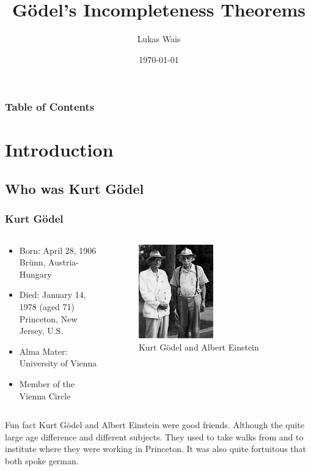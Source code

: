 \documentclass[aspectratio=169]{beamer}
\title{Gödel's Incompleteness Theorems}
\author{Lukas Wais}
\institute{Special Topics Course 326.901}
\date{\today}
\begin{document}
\frame{\titlepage}
\begin{frame}[allowframebreaks]
	\frametitle{Table of Contents}
	\tableofcontents
\end{frame}
\section{Introduction}
\subsection{Who was Kurt Gödel}
\begin{frame}[allowframebreaks]
	\frametitle{Kurt Gödel}
	\begin{columns}
		\begin{column}{0.5\textwidth}
   			\begin{itemize}
   				\item Born: April 28, 1906 Brünn, Austria-Hungary
   				\item Died: January 14, 1978 (aged 71) Princeton, New Jersey, U.S.
   				\item Alma Mater: University of Vienna
   				\item Member of the Vienna Circle
   			\end{itemize}
   		\end{column}
		\begin{column}{0.4\textwidth}
			\begin{figure}[h]
				\centering
				\includegraphics[width=0.5\textwidth]{img/godel_albert}
				\caption{Kurt Gödel and Albert Einstein}
			\end{figure}
		\end{column}	
	\end{columns}
	\begin{block}{Fun fact}
		Kurt Gödel and Albert Einstein were good friends. Although the quite large age difference and different subjects. They used to take walks from and to institute where they were working in Princeton. It was also quite fortuitous that both spoke german.
	\end{block}
\end{frame}
\end{document}
